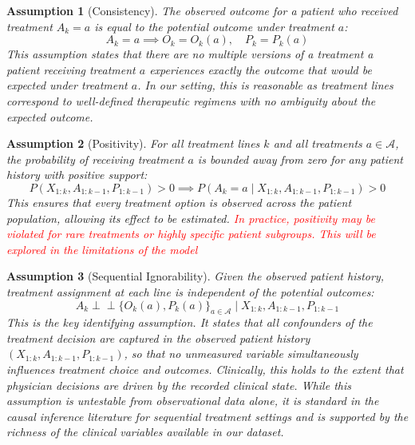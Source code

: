 \documentclass[a4paper,10pt]{article}
\newtheorem{assumption}{Assumption}
\begin{document}
\begin{assumption}[Consistency]
The observed outcome for a patient who received treatment $A_k = a$ is equal to the potential outcome under treatment $a$:
\begin{equation}
    A_k = a \implies O_k = O_k(a), \quad P_k = P_k(a)
\end{equation}
This assumption states that there are no multiple versions of a treatment a patient receiving treatment $a$ experiences exactly the outcome that would be expected under treatment $a$. In our setting, this is reasonable as treatment lines correspond to well-defined therapeutic regimens with no ambiguity about the expected outcome.
\end{assumption}

\begin{assumption}[Positivity]
For all treatment lines $k$ and all treatments $a \in \mathcal{A}$, the probability of receiving treatment $a$ is bounded away from zero for any patient history with positive support:
\begin{equation}
    P(X_{1:k}, A_{1:k-1}, P_{1:k-1}) > 0 \implies 
    P(A_k = a \mid X_{1:k}, A_{1:k-1}, P_{1:k-1}) > 0
\end{equation}
This ensures that every treatment option is observed across the patient population, 
allowing its effect to be estimated. \textcolor{red}{In practice, positivity may be violated for rare 
treatments or highly specific patient subgroups. This will be explored in the limitations of the model}
\end{assumption}

\begin{assumption}[Sequential Ignorability]
Given the observed patient history, treatment assignment at each line is independent of the potential outcomes:
\begin{equation}
    A_k \perp\!\!\!\perp \{O_k(a), P_k(a)\}_{a \in \mathcal{A}} 
    \mid X_{1:k}, A_{1:k-1}, P_{1:k-1}
\end{equation}
This is the key identifying assumption. It states that all confounders of the treatment decision are captured in the observed patient history $(X_{1:k}, A_{1:k-1}, P_{1:k-1})$, so that no unmeasured variable simultaneously influences treatment choice and outcomes. Clinically, this holds to the extent that physician decisions are driven by the recorded clinical state. While this assumption is untestable from observational data alone, it is standard in the causal inference literature for sequential treatment settings and is supported by the richness of the clinical variables available in our dataset.
\end{assumption}
\end{document}
